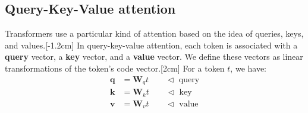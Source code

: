 \subsection{Query-Key-Value attention}
Transformers use a particular kind of attention based on the idea of queries, keys, and values.[-1.2cm] In query-key-value attention, each token is associated with a \textbf{query} vector, a \textbf{key} vector, and a \textbf{value} vector. 
We define these vectors as linear transformations of the token's code vector.[2cm] For a token $t$, we have:
\begin{align}
    \mathbf{q} &= \mathbf{W}_q t \quad\quad \triangleleft \text{ query}\\
    \mathbf{k} &= \mathbf{W}_k t \quad\quad \triangleleft \text{ key}\\
    \mathbf{v} &= \mathbf{W}_v t \quad\quad \triangleleft \text{ value}
\end{align}


